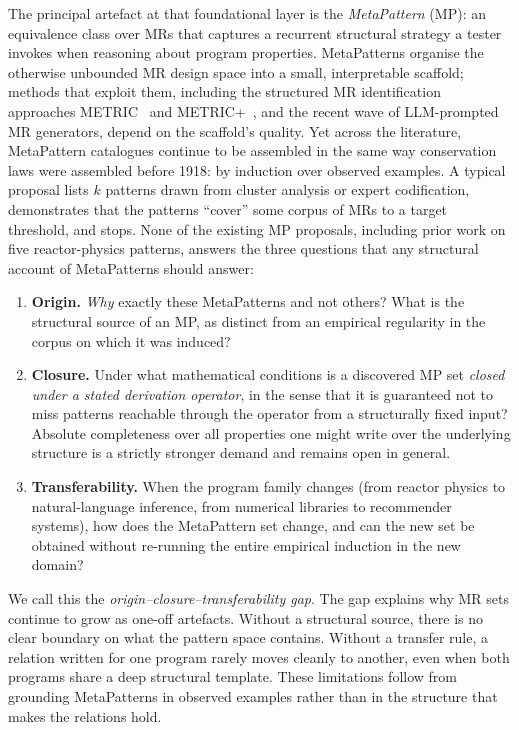 \documentclass[manuscript]{acmart}
\begin{document}
The principal artefact at that foundational layer is the \emph{MetaPattern} (MP): an equivalence class over MRs that captures a recurrent structural strategy a tester invokes when reasoning about program properties. MetaPatterns organise the otherwise unbounded MR design space into a small, interpretable scaffold; methods that exploit them, including the structured MR identification approaches METRIC~\cite{ChenMETRIC2016} and METRIC+~\cite{SunMETRICplus2021}, and the recent wave of LLM-prompted MR generators, depend on the scaffold's quality. Yet across the literature, MetaPattern catalogues continue to be assembled in the same way conservation laws were assembled before 1918: by induction over observed examples. A typical proposal lists $k$ patterns drawn from cluster analysis or expert codification, demonstrates that the patterns ``cover'' some corpus of MRs to a target threshold, and stops. None of the existing MP proposals, including prior work on five reactor-physics patterns, answers the three questions that any structural account of MetaPatterns should answer:

\begin{enumerate}
  \item \textbf{Origin.} \emph{Why} exactly these MetaPatterns and not others? What is the structural source of an MP, as distinct from an empirical regularity in the corpus on which it was induced?
  \item \textbf{Closure.} Under what mathematical conditions is a discovered MP set \emph{closed under a stated derivation operator}, in the sense that it is guaranteed not to miss patterns reachable through the operator from a structurally fixed input? Absolute completeness over all properties one might write over the underlying structure is a strictly stronger demand and remains open in general.
  \item \textbf{Transferability.} When the program family changes (from reactor physics to natural-language inference, from numerical libraries to recommender systems), how does the MetaPattern set change, and can the new set be obtained without re-running the entire empirical induction in the new domain?
\end{enumerate}

We call this the \emph{origin--closure--transferability gap}. The gap explains why MR sets continue to grow as one-off artefacts. Without a structural source, there is no clear boundary on what the pattern space contains. Without a transfer rule, a relation written for one program rarely moves cleanly to another, even when both programs share a deep structural template. These limitations follow from grounding MetaPatterns in observed examples rather than in the structure that makes the relations hold.
\end{document}

